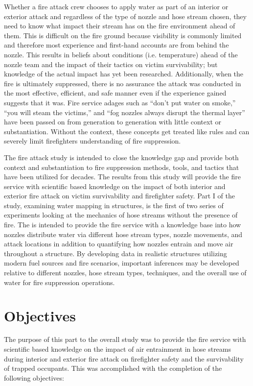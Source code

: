 \documentclass[12pt,oneside]{book}
\begin{document}
Whether a fire attack crew chooses to apply water as part of an interior or exterior attack and regardless of the type of nozzle and hose stream chosen, they need to know what impact their stream has on the fire environment ahead of them. This is difficult on the fire ground because visibility is commonly limited and therefore most experience and first-hand accounts are from behind the nozzle. This results in beliefs about conditions (i.e. temperature) ahead of the nozzle team and the impact of their tactics on victim survivability; but knowledge of the actual impact has yet been researched. Additionally, when the fire is ultimately suppressed, there is no assurance the attack was conducted in the most effective, efficient, and safe manner even if the experience gained suggests that it was. Fire service adages such as ``don't put water on smoke,'' ``you will steam the victims,'' and ``fog nozzles always disrupt the thermal layer'' have been passed on from generation to generation with little context or substantiation. Without the context, these concepts get treated like rules and can severely limit firefighters understanding of fire suppression.

The fire attack study is intended to close the knowledge gap and provide both context and substantiation to fire suppression methods, tools, and tactics that have been utilized for decades. The results from this study will provide the fire service with scientific based knowledge on the impact of both interior and exterior fire attack on victim survivability and firefighter safety. Part I of the study, examining water mapping in structures, is the first of two series of experiments looking at the mechanics of hose streams without the presence of fire. The is intended to provide the fire service with a knowledge base into how nozzles distribute water via different hose stream types, nozzle movements, and attack locations in addition to quantifying how nozzles entrain and move air throughout a structure. By developing data in realistic structures utilizing modern fuel sources and fire scenarios, important inferences may be developed relative to different nozzles, hose stream types, techniques, and the overall use of water for fire suppression operations.

\clearpage

\chapter{Objectives}

The purpose of this part to the overall study was to provide the fire service with scientific based knowledge on the impact of air entrainment in hose streams during interior and exterior fire attack on firefighter safety and the survivability of trapped occupants. This was accomplished with the completion of the following objectives:
\end{document}
